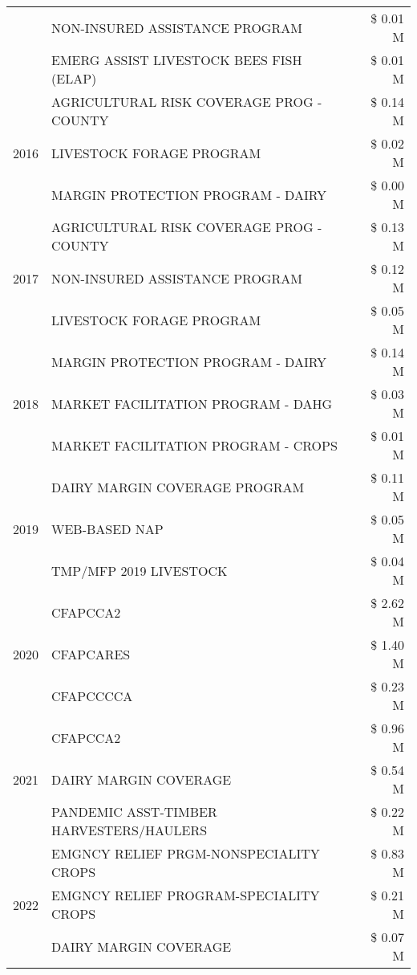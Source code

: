 \begin{tabular}{llr}
 & NON-INSURED ASSISTANCE PROGRAM & \$ 0.01 M \\
 & EMERG ASSIST LIVESTOCK BEES FISH (ELAP) & \$ 0.01 M \\
\cline{1-3}
\multirow[t]{3}{*}{2016} & AGRICULTURAL RISK COVERAGE PROG - COUNTY & \$ 0.14 M \\
 & LIVESTOCK FORAGE PROGRAM & \$ 0.02 M \\
 & MARGIN PROTECTION PROGRAM - DAIRY & \$ 0.00 M \\
\cline{1-3}
\multirow[t]{3}{*}{2017} & AGRICULTURAL RISK COVERAGE PROG - COUNTY & \$ 0.13 M \\
 & NON-INSURED ASSISTANCE PROGRAM & \$ 0.12 M \\
 & LIVESTOCK FORAGE PROGRAM & \$ 0.05 M \\
\cline{1-3}
\multirow[t]{3}{*}{2018} & MARGIN PROTECTION PROGRAM - DAIRY & \$ 0.14 M \\
 & MARKET FACILITATION PROGRAM - DAHG & \$ 0.03 M \\
 & MARKET FACILITATION PROGRAM - CROPS & \$ 0.01 M \\
\cline{1-3}
\multirow[t]{3}{*}{2019} & DAIRY MARGIN COVERAGE PROGRAM & \$ 0.11 M \\
 & WEB-BASED NAP & \$ 0.05 M \\
 & TMP/MFP 2019 LIVESTOCK & \$ 0.04 M \\
\cline{1-3}
\multirow[t]{3}{*}{2020} & CFAPCCA2 & \$ 2.62 M \\
 & CFAPCARES & \$ 1.40 M \\
 & CFAPCCCCA & \$ 0.23 M \\
\cline{1-3}
\multirow[t]{3}{*}{2021} & CFAPCCA2 & \$ 0.96 M \\
 & DAIRY MARGIN COVERAGE & \$ 0.54 M \\
 & PANDEMIC ASST-TIMBER HARVESTERS/HAULERS & \$ 0.22 M \\
\cline{1-3}
\multirow[t]{3}{*}{2022} & EMGNCY RELIEF PRGM-NONSPECIALITY CROPS & \$ 0.83 M \\
 & EMGNCY RELIEF PROGRAM-SPECIALITY CROPS & \$ 0.21 M \\
 & DAIRY MARGIN COVERAGE & \$ 0.07 M \\
\cline{1-3}
\bottomrule
\end{tabular}
